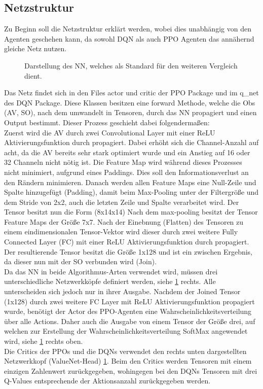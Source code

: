 \subsection{Netzstruktur} \label{sec:Impl_Netzstruktur}
Zu Beginn soll die Netzstruktur erklärt werden, wobei dies unabhängig von den Agenten geschehen kann, da sowohl DQN als auch PPO Agenten das annähernd gleiche Netz nutzen.
\begin{figure}[H]
	\centering
	\def\svgscale{0.85}
	
	\caption[BaseNet]{Darstellung des NN, welches als Standard für den weiteren Vergleich dient.}
	\label{fig:Netzsturktur}
\end{figure}
Das Netz findet sich in den Files actor und critic der PPO Package und im q\_net des DQN Package. 
Diese Klassen besitzen eine forward Methode, welche die Obs (AV, SO), nach dem umwandelt in Tensoren, durch das NN propagiert und einen Output bestimmt. Dieser Prozess geschieht dabei folgendermaßen:\\
Zuerst wird die AV durch zwei Convolutional Layer mit einer ReLU Aktivierungsfunktion durch propagiert. Dabei erhöht sich die Channel-Anzahl auf acht, da die AV bereits sehr stark optimiert wurde und ein Anstieg auf 16 oder 32 Channeln nicht nötig ist. Die Feature Map wird während dieses Prozesses nicht minimiert, aufgrund eines Paddings. Dies soll den Informationsverlust an den Rändern minimieren.  
Danach werden allen Feature Maps eine Null-Zeile und Spalte hinzugefügt (Padding), damit beim Max-Pooling unter der Filtergröße und dem Stride von 2x2, auch die letzten Zeile und Spalte verarbeitet wird. Der Tensor besitzt nun die Form (8x14x14) 
Nach dem max-pooling besitzt der Tensor Feature Maps der Größe 7x7. Nach der Einebnung (Flatten) des Tensoren zu einem eindimensionalen Tensor-Vektor wird dieser durch zwei weitere Fully Connected Layer (FC) mit einer ReLU Aktivierungsfunktion durch propagiert. Der resultierende Tensor besitzt die Größe 1x128 und ist ein zwischen Ergebnis, da dieser nun mit der SO verbunden wird (Join).\\
Da das NN in beide Algorithmus-Arten verwendet wird, müssen drei unterschiedliche Netzwerkköpfe definiert werden, siehe \ref{fig:Netzsturktur} rechts. Alle unterscheiden sich jedoch nur in ihrer Ausgabe. Nachdem der Joined Tensor (1x128) durch zwei weitere FC Layer mit ReLU Aktivierungsfunktion propagiert wurde, benötigt der Actor des PPO-Agenten eine Wahrscheinlichkeitsverteilung über alle Actions. Daher auch die Ausgabe von einem Tensor der Größe drei, auf welchen zur Erstellung der Wahrscheinlichkeitsverteilung SoftMax angewendet wird, siehe \ref{fig:Netzsturktur} rechts oben.\\
Die Critics der PPOs und die DQNs verwendet den rechts unten dargestellten Netzwerkkopf (ValueNet-Head) \ref{fig:Netzsturktur}. Beim den Critics werden Tensoren mit einem einzigen Zahlenwert zurückgegeben, wohingegen bei den DQNs Tensoren mit drei Q-Values entsprechende der Aktionsanzahl zurückgegeben werden.

